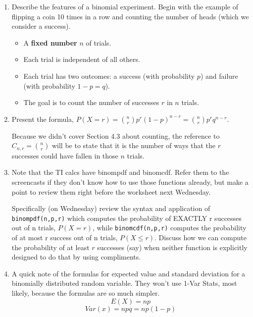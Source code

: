 \documentclass{article}
\begin{document}
\begin{enumerate}

    \item  Describe the features of a binomial experiment. Begin with the example of flipping a coin 10 times in a row and counting the number of heads (which we consider a success).
    
        \begin{itemize}
        
            \item A \textbf{fixed number} $n$  of trials.
            
            \item Each trial is independent of all others.
            
            \item Each trial has two outcomes: a success (with probability $p$) and failure (with probability $1-p=q$).
            
            \item The goal is to count the number of successes $r$ in $n$ trials. 
            
        \end{itemize}
        
    \item Present the formula, $P(X=r) = \binom{n}{r}p^r(1-p)^{n-r} = \binom{n}{r}p^r q^{n-r}.$
    
         Because we didn’t cover Section 4.3 about counting, the reference to $C_{n,r}=\binom{n}{r}$ will be to state that it is the number of ways that the $r$ successes could have fallen in those $n$ trials.
         
    \item Note that the TI calcs have binompdf and binomcdf. Refer them to the screencasts if they don’t know how to use those functions already, but make a point to review them right before the worksheet next Wednesday.
    
     Specifically (on Wednesday) review the syntax and application of \texttt{binompdf(n,p,r)} which computes the probability of EXACTLY r successes out of n trials, $P(X=r)$, while \texttt{binomcdf(n,p,r)} computes the probability of at most r success out of n trials, $P(X\leq r)$.  Discuss how we can compute the probability of at least $r$ successes (say) when neither function is explicitly designed to do that by using compliments.
     
    \item A quick note of the formulas for expected value and standard deviation for a binomially distributed random variable.  They won’t use 1-Var Stats, most likely, because the formulas are so much simpler.
    $$E(X) = np$$
    $$Var(x) = npq=np(1-p)$$
    
\end{enumerate}
\end{document}
